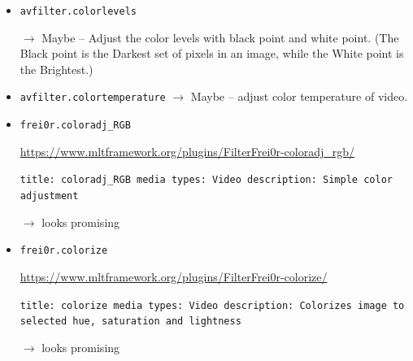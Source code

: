 \documentclass[12pt,a4paper]{article}
\begin{document}
\begin{itemize}
\begin{itemize}
		
		\item \texttt{avfilter.colorlevels}
		
		$\rightarrow$ Maybe -- Adjust the color levels with black point and white point.
		(The Black point is the Darkest set of pixels in an image, while the White point is the Brightest.)
		
		
		
		
		\item \texttt{avfilter.colortemperature}
		$\rightarrow$ Maybe -- adjust color temperature of video.
		
		
		\item \texttt{frei0r.coloradj\_RGB}
		
		\url{https://www.mltframework.org/plugins/FilterFrei0r-coloradj_rgb/}
		
		\texttt{title: coloradj\_RGB \newline
			media types: Video \newline
			description: Simple color adjustment}
		
		$\rightarrow$ looks promising
		
		
		\item \texttt{frei0r.colorize}
		
		\url{https://www.mltframework.org/plugins/FilterFrei0r-colorize/}
		
		\texttt{title: colorize \newline
			media types: Video \newline
			description: Colorizes image to selected hue, saturation and lightness}
		
		$\rightarrow$ looks promising
		
		
	\end{itemize}


\end{itemize}



\newpage

\begin{spacing}{1}
	\printbibliography
\end{spacing}
	
	
	
\end{document}
